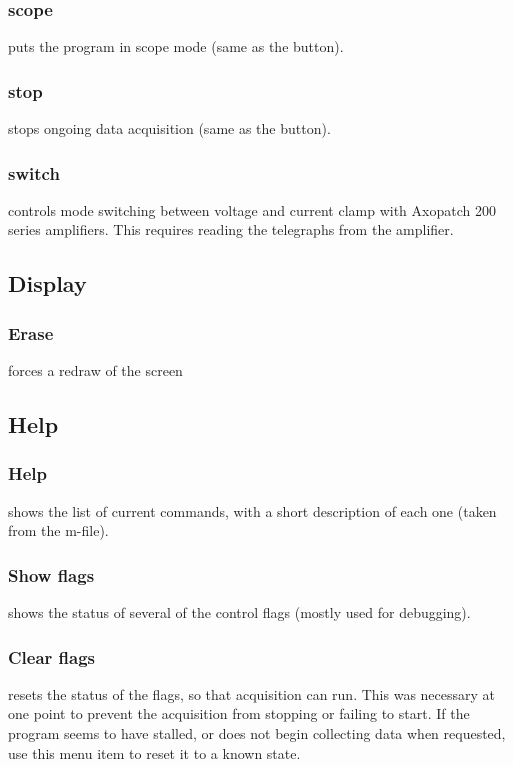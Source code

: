 \documentclass[11pt, letterpaper, titlepage]{paper}
\begin{document}
\subsubsection{scope} puts the program in scope mode (same as the 
button).

\subsubsection{stop} stops ongoing data acquisition (same as the 
button).

\subsubsection{switch} controls mode switching between voltage and 
current clamp with Axopatch 200 series amplifiers. This requires 
reading the telegraphs from the amplifier.

\subsection{Display}

\subsubsection{Erase} forces a redraw of the screen

\subsection{Help}
\subsubsection{Help} shows the list of current commands, with a short 
description of each one (taken from the m-file).

\subsubsection{Show flags} shows the status of several of the control 
flags (mostly used for debugging).

\subsubsection{Clear flags} resets the status of the flags, so that 
acquisition can run. This was necessary at one point to prevent 
the acquisition from stopping or failing to start. If the program 
seems to have stalled, or does not begin collecting data when 
requested, use this menu item to reset it to a known state.
\end{document}
